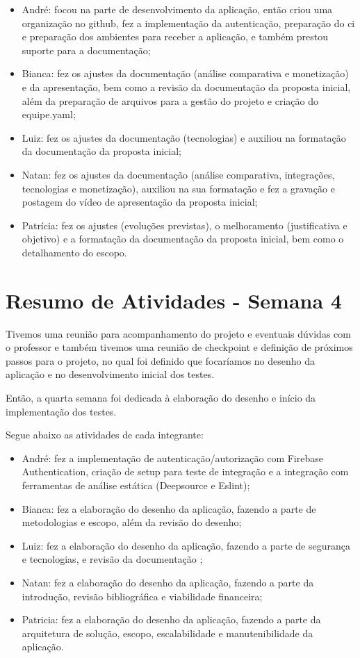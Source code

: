 \documentclass[
    12pt,               %
    openright,          %
    oneside,
    a4paper,            %
    english,            %
    brazil              %
    ]{ifsp-spo-inf-ctds} %
\begin{document}
\begin{apendicesenv}
\begin{itemize}
\item André: focou na parte de desenvolvimento da aplicação, então criou uma organização no \gls{github}, fez a implementação da autenticação, preparação do \ac{ci} e preparação dos ambientes para receber a aplicação, e também prestou suporte para a documentação;
\item Bianca: fez os ajustes da documentação (análise comparativa e monetização) e da apresentação, bem como a revisão da documentação da proposta inicial, além da preparação de arquivos para a gestão do projeto e criação do equipe.yaml;
\item Luiz: fez os ajustes da documentação (tecnologias) e auxiliou na formatação da documentação da proposta inicial;
\item Natan: fez os ajustes da documentação (análise comparativa, integrações, tecnologias e monetização), auxiliou na sua formatação e fez a gravação e postagem do vídeo de apresentação da proposta inicial;
\item Patrícia: fez os ajustes (evoluções previstas), o melhoramento (justificativa e objetivo) e a formatação da documentação da proposta inicial, bem como o detalhamento do escopo.
\end{itemize}

\section{Resumo de Atividades - Semana 4}
Tivemos uma reunião para acompanhamento do projeto e eventuais dúvidas com o professor e também tivemos uma reunião de \gls{checkpoint} e definição de próximos passos para o projeto, no qual foi definido que focaríamos no desenho da aplicação e no desenvolvimento inicial dos testes.

Então, a quarta semana foi dedicada à elaboração do desenho e início da implementação dos testes. 

Segue abaixo as atividades de cada integrante:

\begin{itemize}
\item André: fez a implementação de autenticação/autorização com Firebase Authentication, criação de \gls{setup} para teste de integração e a integração com ferramentas de análise estática (Deepsource e Eslint);
\item Bianca: fez a elaboração do desenho da aplicação, fazendo a parte de metodologias e escopo, além da revisão do desenho;
\item Luiz: fez a elaboração do desenho da aplicação, fazendo a parte de segurança e tecnologias, e revisão da documentação ;
\item Natan: fez a elaboração do desenho da aplicação, fazendo a parte da introdução, revisão bibliográfica e viabilidade financeira;
\item Patricia: fez a elaboração do desenho da aplicação, fazendo a parte da arquitetura de solução, escopo, escalabilidade e manutenibilidade da aplicação.
\end{itemize}


\end{apendicesenv}
\end{document}
